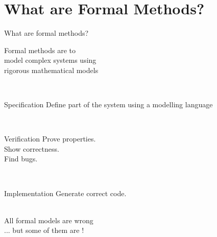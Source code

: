 \documentclass[aspectratio=169]{beamer}
\begin{document}
\frame[plain]{\titlepage}


\section{What are Formal Methods?}


\begin{slide}{What are formal methods?}
  \centering

  \begin{minipage}{0.7\textwidth}
  \Large
  \begin{block}{}
    \centering
    Formal methods are  to
    \\
    model \alert{complex systems} using
    \\
    \alert{rigorous mathematical models}

  \end{block}
  \end{minipage}
  \\[10mm]

  \begin{minipage}{0.32\textwidth}
  \begin{alertblock}{Specification}
    Define part of the system using a modelling language
  \end{alertblock}
  \end{minipage}
~~
  \begin{minipage}{0.3\textwidth}
  \begin{alertblock}{Verification}
    Prove properties.\\Show correctness.\\Find bugs.
  \end{alertblock}
  \end{minipage}
~~
  \begin{minipage}{0.28\textwidth}
  \begin{exampleblock}{Implementation}
    Generate correct code.\\~\\
  \end{exampleblock}
  \end{minipage}

\end{slide}

\begin{frame}
  \huge\centering
  All formal models are \alert{wrong}
  \pause
  \\[5mm]
  ... but some of them are !
\end{frame}
\end{document}

